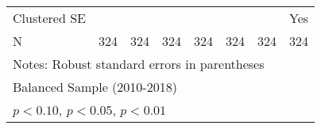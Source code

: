 \begin{table}[htbp]
\begin{tabular}{l*{7}{c}}
Clustered SE        &                     &                     &                     &                     &                     &                     &         Yes         \\
N                   &         324         &         324         &         324         &         324         &         324         &         324         &         324         \\
\bottomrule
\multicolumn{8}{l}{\footnotesize Notes: Robust standard errors in parentheses}\\
\multicolumn{8}{l}{\footnotesize Balanced Sample (2010-2018)}\\
\multicolumn{8}{l}{\footnotesize \sym{*} \(p<0.10\), \sym{**} \(p<0.05\), \sym{***} \(p<0.01\)}\\
\end{tabular}
\end{table}
